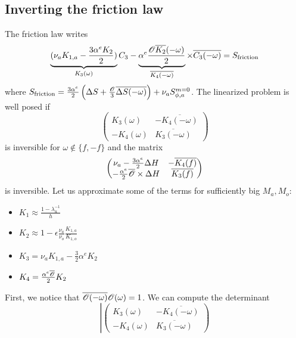 \begin{subappendices}
\subsection{Inverting the friction law}
The friction law writes
\begin{equation}
	\underbrace{(\nu_a K_{1,a} - \frac{3\alpha^e K_{2}}{2})}_{
		K_3(\omega)
	}{C}_3
	-\underbrace{
		\alpha^e \frac{{\cal O} \overline{K_2}(-\omega)}{2}}_{
		\overline{K_4(-\omega)}}
	\times \overline{{C}_3(-\omega)}
	= S_{\rm friction}
\end{equation}
where $S_{\rm friction} =
	\frac{3\alpha^e}{2} \left(
	\Delta S + \frac{\cal O}{3}
	\overline{\Delta S(-\omega)}\right)
	+\nu_a S_{\phi,a}^{m=0}$.
The linearized problem is well posed if
\begin{equation}
	\label{eq:OASchwarz_appendix_matrix_omega}
	\begin{pmatrix}
		K_3(\omega)& - \overline{K_4(-\omega)}\\
		-K_4(\omega) & \overline{K_3(-\omega)}
	\end{pmatrix}
\end{equation}
is inversible for $\omega \notin \{f, -f\}$ and
the matrix
\begin{equation}
	\label{eq:OASchwarz_appendix_matrix_f}
	\begin{pmatrix}
		\nu_a - \frac{3 \alpha^e}{2}\Delta H &
		-\overline{K_4(f)} \\
		-\frac{\alpha^e}{2}\overline{\cal O} \times \Delta H&
		\overline{K_3(f)}
	\end{pmatrix}
\end{equation}
is inversible.
Let us approximate some of the terms for sufficiently big $M_a, M_o$:
\begin{itemize}
	\item $K_1 \approx \frac{1 - \lambda_u^{-1}}{h}$
	\item $K_2 \approx 1 - \epsilon\frac{\nu_a}{\nu_o}
		\frac{K_{1,a}}{K_{1,o}}$
	\item $K_3 = \nu_a K_{1,a} - \frac{3}{2} \alpha^e K_2$
	\item $K_4 = \frac{\alpha^e \overline{{\cal O}}}
		{2}K_2$
\end{itemize}
First, we notice that $\overline{ {\cal O}(-\omega)}
	{\cal O}(\omega) = 1$.
We can compute the determinant
\begin{equation}
\left|
\begin{pmatrix}
	K_3(\omega)& - \overline{K_4(-\omega)}\\
	-K_4(\omega) & \overline{K_3(-\omega)}

\end{pmatrix}
\end{equation}
\end{subappendices}
